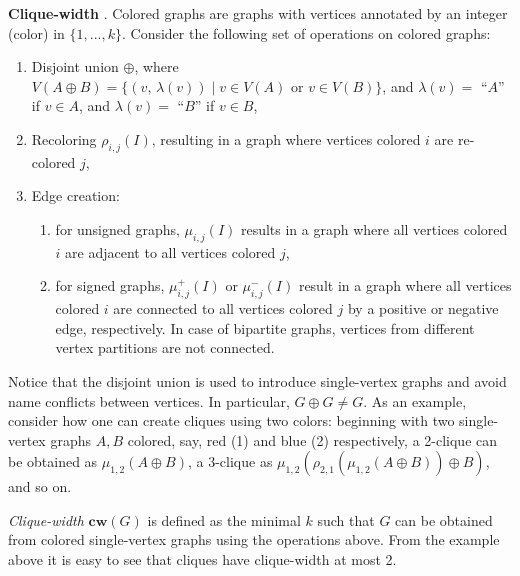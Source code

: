 \documentclass{article}
\begin{document}

\noindent
\textbf{Clique-width} \cite{DBLP:journals/dam/FischerMR08}.
Colored graphs are graphs with vertices annotated by an integer (color) in $\{1,...,k\}$.
Consider the following set of operations on colored graphs:
\begin{enumerate}
	\item Disjoint union $\oplus$, where $V(A \oplus B)=\{ (v,\, \lambda(v)) \; | \; v \in V(A) \text{ or } v\in V(B) \}$, and $\lambda(v)=$ ``$A$'' if $v\in A$, and $\lambda(v)=$ ``$B$'' if $v\in B$,
	\item Recoloring $\rho_{i,j}(I)$, resulting in a graph where vertices colored $i$ are re-colored $j$,
	\item Edge creation:
	\begin{enumerate}
		\item for unsigned graphs, $\mu_{i,j}(I)$ results in a graph where all vertices colored $i$ are adjacent to all vertices colored $j$,
		\item for signed graphs, $\mu_{i,j}^+(I)$ or $\mu_{i,j}^-(I)$ result in a graph where all vertices colored $i$ are connected to all vertices colored $j$ by a positive or negative edge, respectively. In case of bipartite graphs, vertices from different vertex partitions are not connected.
	\end{enumerate}
\end{enumerate}

\noindent
Notice that the disjoint union is used to introduce single-vertex graphs and avoid name conflicts between vertices.
In particular, $G \oplus G \neq G$.
As an example, consider how one can create cliques using two colors: beginning with two single-vertex graphs $A, B$ colored, say, red (1) and blue (2) respectively, a 2-clique can be obtained as $\mu_{1,2}(A \oplus B)$, a 3-clique as $\mu_{1,2}(\rho_{2,1}(\mu_{1,2}(A \oplus B)) \oplus B)$, and so on.

{\em Clique-width} $\textbf{cw}(G)$ is defined as the minimal $k$ such that $G$ can be obtained from colored single-vertex graphs using the operations above.
From the example above it is easy to see that cliques have clique-width at most 2.\\
\end{document}

